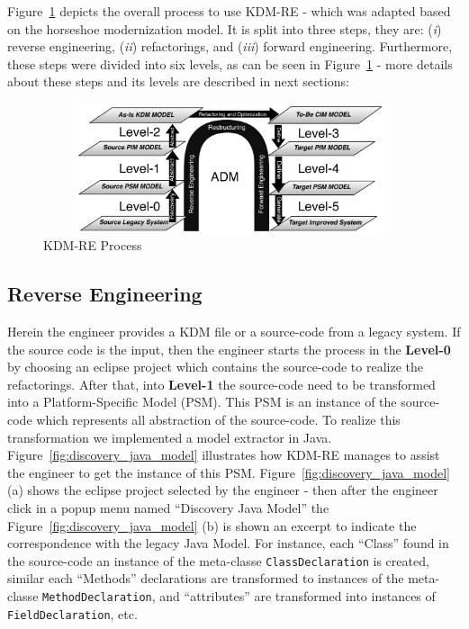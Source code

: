 Figure~\ref{fig:process} depicts the overall process to use KDM-RE - which was adapted based on the horseshoe modernization model. 
It is split into three steps, they are: 
(\textit{i}) reverse engineering, 
(\textit{ii}) refactorings, and 
(\textit{iii}) forward engineering. 
Furthermore, these steps were divided into six levels, as can be seen in Figure~\ref{fig:process} - more details about these steps and its levels are described in next sections:

\begin{figure}[!ht]
\centering
  \includegraphics[width=11cm, height=3.8cm]{figure/processoDaFerramenta}
\caption{KDM-RE Process}
\label{fig:process}
\end{figure} 

\subsection{Reverse Engineering}

Herein the engineer provides a KDM file or a source-code from a legacy system. If the source code is the input, then the engineer starts the process in the \textbf{Level-0} by choosing an eclipse project which contains the source-code to realize the refactorings.  
After that, into \textbf{Level-1} the source-code need to be transformed into a Platform-Specific Model (PSM). 
This PSM is an instance of the source-code which represents all abstraction of the source-code. To realize this transformation we implemented a model extractor in Java. 
Figure~\ref{fig:discovery_java_model} illustrates how KDM-RE manages to assist the engineer to get the instance of this PSM. Figure~\ref{fig:discovery_java_model} (a) shows the eclipse project selected by the engineer - then after the engineer click in a popup menu named ``Discovery Java Model'' the Figure~\ref{fig:discovery_java_model} (b) is shown an excerpt to indicate the correspondence with the legacy Java Model. For instance, each ``Class'' found in the source-code an instance of the meta-classe \texttt{ClassDeclaration} is created, similar each ``Methods'' declarations are transformed to instances of the meta-classe \texttt{MethodDeclaration}, and ``attributes'' are transformed into instances of \texttt{FieldDeclaration}, etc.



